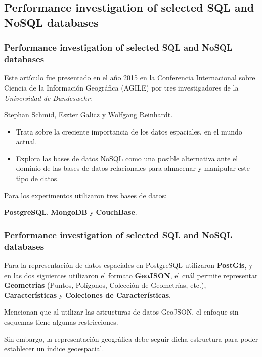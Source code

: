 \subsection{Performance investigation of selected SQL and NoSQL databases}

\begin{frame}
    \frametitle{Performance investigation of selected SQL and NoSQL databases}

    Este artículo fue presentado en el año 2015 en la Conferencia Internacional sobre Ciencia de la Información Geográfica (AGILE) por tres investigadores de la \textit{Universidad de Bundeswehr}:

     
    
    \begin{center}
        Stephan Schmid, Eszter Galicz y Wolfgang Reinhardt.
    \end{center}
    
     

    \begin{itemize}
        \item Trata sobre la creciente importancia de los datos espaciales, en el mundo actual.

         

        \item Explora las bases de datos NoSQL como una posible alternativa ante el dominio de las bases de datos relacionales para almacenar y manipular este tipo de datos.
    \end{itemize}
    
     
    
    Para los experimentos utilizaron tres bases de datos:

    \begin{center}
        \textbf{PostgreSQL}, \textbf{MongoDB} y \textbf{CouchBase}.
    \end{center}
\end{frame}

\begin{frame}
    \frametitle{Performance investigation of selected SQL and NoSQL databases}

    Para la representación de datos espaciales en PostgreSQL utilizaron \textbf{PostGis},   y en las dos siguientes utilizaron el formato \textbf{GeoJSON}, el cuál permite representar \textbf{Geometrías} (Puntos, Polígonos, Colección de Geometrías, etc.), \textbf{Características} y \textbf{Coleciones de Características}.

     

    Mencionan que al utilizar las estructuras de datos GeoJSON, el enfoque sin esquemas tiene algunas restricciones.
    
     
    
    Sin embargo, la representación geográfica debe seguir dicha estructura para poder establecer un índice geoespacial.
    
\end{frame}

